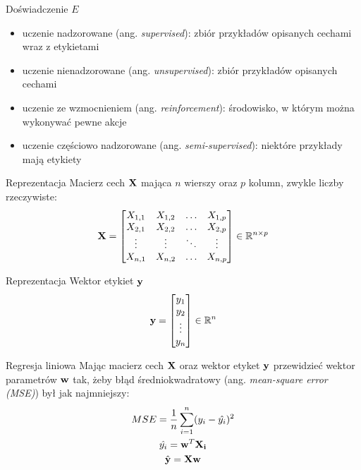 \documentclass{sa}
\newcommand{\ang}[1]{(ang. \emph{#1})}
\renewcommand{\vec}[1]{\ensuremath\mathbf{#1}}
\begin{document}
\begin{frame}{Doświadczenie $E$}
\begin{itemize}
\item uczenie nadzorowane \ang{supervised}: zbiór przykładów opisanych cechami wraz z etykietami
\item uczenie nienadzorowane \ang{unsupervised}: zbiór przykładów opisanych cechami
\item uczenie ze wzmocnieniem \ang{reinforcement}: środowisko, w którym można wykonywać pewne akcje
\item uczenie częściowo nadzorowane \ang{semi-supervised}: niektóre przykłady mają etykiety
\end{itemize}
\end{frame}

\begin{frame}{Reprezentacja}
Macierz cech $\vec{X}$ mająca $n$ wierszy oraz $p$ kolumn, zwykle liczby rzeczywiste:
\[ \vec{X} = \begin{bmatrix}
X_{1,1} & X_{1,2} & \ldots & X_{1,p} \\
X_{2,1} & X_{2,2} & \ldots & X_{2,p} \\
\vdots & \vdots & \ddots & \vdots \\
X_{n,1} & X_{n,2} & \ldots & X_{n,p} \\
\end{bmatrix} \in \R^{n\times p} \]
\end{frame}

\begin{frame}{Reprezentacja}
Wektor etykiet $\vec{y}$
\[ \vec{y} = \begin{bmatrix}
y_1 \\
y_2 \\
\vdots \\
y_n
\end{bmatrix} \in \R^n \]
\end{frame}

\begin{frame}{Regresja liniowa}
Mając macierz cech $\vec{X}$ oraz wektor etyket $\vec{y}$ przewidzieć \alert{wektor parametrów} $\vec{w}$ tak, żeby błąd średniokwadratowy \ang{mean-square error (MSE)} był jak najmniejszy:
\begin{gather*}
MSE=\frac{1}{n}\sum_{i=1}^n (y_i-\hat{y_i})^2  \\
\hat{y_i}=\vec{w}^T\vec{X_i}  \\
\hat{\vec{y}} = \vec{X}\vec{w}
\end{gather*}
\end{frame}
\end{document}
